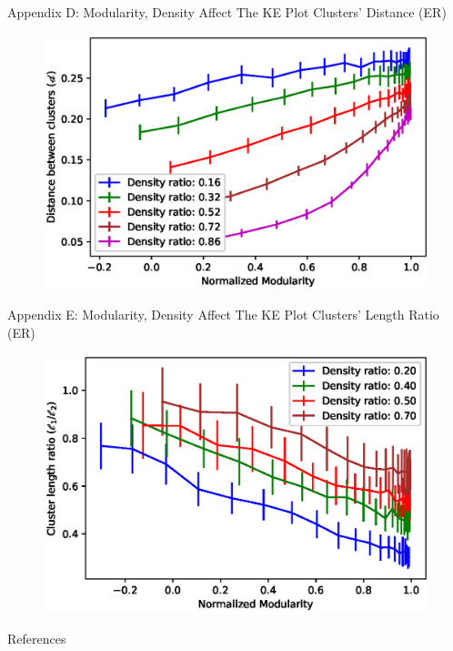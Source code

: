 \documentclass[aspectratio=169,11pt]{beamer}
\begin{document}
\begin{frame}{Appendix D: Modularity, Density Affect The KE Plot Clusters' Distance (ER)}
	\begin{figure}
		\centering
		\includegraphics[scale=0.7]{distance_ba.eps}
	\end{figure}
\end{frame}

\begin{frame}{Appendix E: Modularity, Density Affect The KE Plot Clusters' Length Ratio (ER)}
	\begin{figure}
		\centering
		\includegraphics[scale=0.7]{length_er.eps}
	\end{figure}
\end{frame}

\begin{frame}[allowframebreaks]{References}
	
	
\end{frame}
\end{document}

